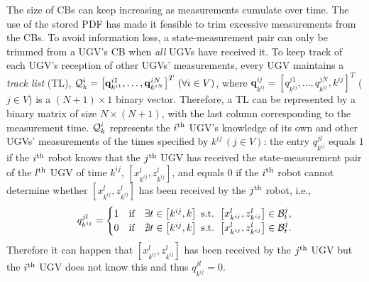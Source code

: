 	The size of CBs can keep increasing as measurements cumulate over time. 
	The use of the stored PDF has made it feasible to trim excessive measurements from the CBs.
	To avoid information loss, a state-measurement pair can only be trimmed from a UGV's CB when \textit{all} UGVs have received it.
	To keep track of each UGV's reception of other UGVs' measurements, every UGV maintains a \textit{track list} (TL), $\mathcal{Q}^i_k=\left[\mathbf{q}^{i1}_{k^{i1}},\dots, \mathbf{q}^{iN}_{k^{iN}}\right]^T \,(\forall i\in V)$, where $\mathbf{q}^{ij}_{k^{ij}}=\left[q^{j1}_{k^{ij}},\dots,q^{jN}_{k^{ij}},k^{ij}\right]^T$ ($j\in V$) is a $(N+1)\times 1$ binary vector.
	Therefore, a TL can be represented by a binary matrix of size $N\times (N+1)$, with the last column corresponding to the measurement time.
	$\mathcal{Q}^i_k$ represents the $i^\text{th}$ UGV's knowledge of its own and other UGVs' measurements of the times specified by $k^{ij}\,(j\in V)$: %
	the entry $q^{jl}_{k^{ij}}$ equals $1$ if the $i^\text{th}$ robot knows that the $j^\text{th}$ UGV has received the state-measurement pair of the $l^\text{th}$ UGV of time $k^{ij}$, $\left[x^l_{k^{ij}},z^l_{k^{ij}}\right]$, and equals $0$ if the $i^\text{th}$ robot cannot determine whether $\left[x^l_{k^{ij}},z^l_{k^{ij}}\right]$ has been received by the $j^\text{th}$ robot, i.e.,
	\small\begin{equation}\label{eqn:tl_entry}
	q^{jl}_{k^{ij}}=
	\begin{cases}
	1 & \text{if}\quad \exists t\in\left[k^{ij}, k\right] \text{ s.t. } \left[x^l_{k^{ij}},z^l_{k^{ij}}\right]\in \mathcal{B}^j_t,\\
	0 & \text{if}\quad \nexists t\in\left[k^{ij}, k\right] \text{ s.t. } \left[x^l_{k^{ij}},z^l_{k^{ij}}\right]\in \mathcal{B}^j_t.
	\end{cases}
	\end{equation}\normalsize
	Therefore it can happen that $\left[x^l_{k^{ij}},z^l_{k^{ij}}\right]$ has been received by the $j^\text{th}$ UGV but the $i^\text{th}$ UGV does not know this and thus $q^{jl}_{k^{ij}}=0$.
	
